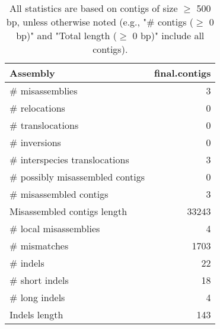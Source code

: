 \documentclass[12pt,a4paper]{article}
\begin{document}
\begin{table}[ht]
\begin{center}
\caption{All statistics are based on contigs of size $\geq$ 500 bp, unless otherwise noted (e.g., "\# contigs ($\geq$ 0 bp)" and "Total length ($\geq$ 0 bp)" include all contigs).}
\begin{tabular}{|l*{1}{|r}|}
\hline
Assembly & final.contigs \\ \hline
\# misassemblies & 3 \\ \hline
\hspace{5mm}\# relocations & 0 \\ \hline
\hspace{5mm}\# translocations & 0 \\ \hline
\hspace{5mm}\# inversions & 0 \\ \hline
\hspace{5mm}\# interspecies translocations & 3 \\ \hline
\# possibly misassembled contigs & 0 \\ \hline
\# misassembled contigs & 3 \\ \hline
Misassembled contigs length & 33243 \\ \hline
\# local misassemblies & 4 \\ \hline
\# mismatches & 1703 \\ \hline
\# indels & 22 \\ \hline
\hspace{5mm}\# short indels & 18 \\ \hline
\hspace{5mm}\# long indels & 4 \\ \hline
Indels length & 143 \\ \hline
\end{tabular}
\end{center}
\end{table}
\end{document}
